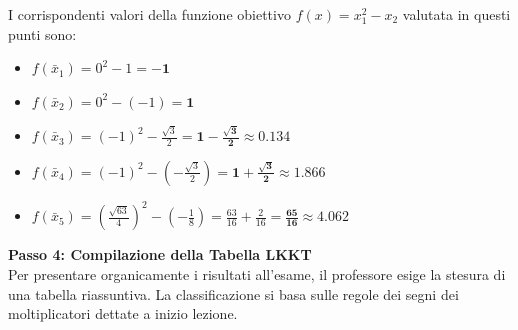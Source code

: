 \documentclass[12pt, a4paper]{article}
\begin{document}
	I corrispondenti valori della funzione obiettivo $f(x) = x_1^2 - x_2$ valutata in questi punti sono:
	\begin{itemize}
		\item $f(\bar{x}_1) = 0^2 - 1 = \mathbf{-1}$
		\item $f(\bar{x}_2) = 0^2 - (-1) = \mathbf{1}$
		\item $f(\bar{x}_3) = (-1)^2 - \frac{\sqrt{3}}{2} = \mathbf{1 - \frac{\sqrt{3}}{2}} \approx 0.134$
		\item $f(\bar{x}_4) = (-1)^2 - \left(-\frac{\sqrt{3}}{2}\right) = \mathbf{1 + \frac{\sqrt{3}}{2}} \approx 1.866$
		\item $f(\bar{x}_5) = \left(\frac{\sqrt{63}}{4}\right)^2 - \left(-\frac{1}{8}\right) = \frac{63}{16} + \frac{2}{16} = \mathbf{\frac{65}{16}} \approx 4.062$
	\end{itemize}
	
	\vspace{0.4cm}
	\textbf{Passo 4: Compilazione della Tabella LKKT}\\
	Per presentare organicamente i risultati all'esame, il professore esige la stesura di una tabella riassuntiva. La classificazione si basa sulle regole dei segni dei moltiplicatori dettate a inizio lezione.
	
\end{document}
